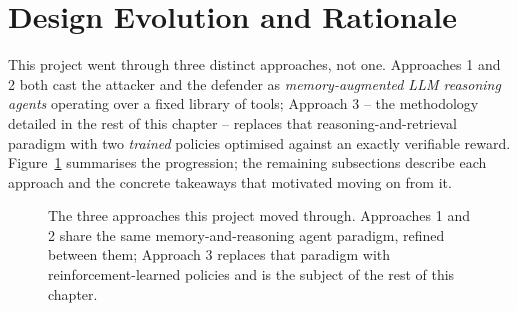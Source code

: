 \section{Design Evolution and Rationale}
\label{sec:method-evolution}

This project went through three distinct approaches, not one. Approaches 1 and 2 both cast the attacker and the defender as \emph{memory-augmented LLM reasoning agents} operating over a fixed library of tools; Approach 3 -- the methodology detailed in the rest of this chapter -- replaces that reasoning-and-retrieval paradigm with two \emph{trained} policies optimised against an exactly verifiable reward. Figure~\ref{fig:approach-comparison} summarises the progression; the remaining subsections describe each approach and the concrete takeaways that motivated moving on from it.

\begin{figure}[h]
\centering
{}
\caption{The three approaches this project moved through. Approaches 1 and 2 share the same memory-and-reasoning agent paradigm, refined between them; Approach 3 replaces that paradigm with reinforcement-learned policies and is the subject of the rest of this chapter.}
\label{fig:approach-comparison}
\end{figure}

